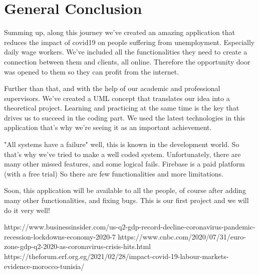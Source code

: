 \documentclass[12pt]{report}
\begin{document}
\chapter*{General Conclusion}
Summing up, along this journey we've created an amazing application that reduces the impact of covid19 on people suffering from unemployment. Especially daily wage workers.
We've included all the functionalities they need to create a connection between them and clients, all online.
Therefore the opportunity door was opened to them so they can profit from the internet.

Further than that, and with the help of our academic and professional supervisors. We've created a UML concept that translates our idea into a theoretical project.
Learning and practicing at the same time is the key that drives us to succeed in the coding part. We used the latest technologies in this application that's why we're seeing it as an important achievement.

"All systems have a failure" well, this is known in the development world. So that's why we've tried to make a well coded system.
Unfortunately, there are many other missed features, and some logical fails. Firebase is a paid platform (with a free trial) So there are few functionalities and more limitations.

Soon, this application will be available to all the people, of course after adding many other functionalities, and fixing bugs. This is our first project and we will do it very well!


\vspace{3cm}
\textbullet https://www.businessinsider.com/us-q2-gdp-record-decline-coronavirus-pandemic-recession-lockdowns-economy-2020-7\newline
\textbullet https://www.cnbc.com/2020/07/31/euro-zone-gdp-q2-2020-as-coronavirus-crisis-hits.html\newline
\textbullet https://theforum.erf.org.eg/2021/02/28/impact-covid-19-labour-markets-evidence-morocco-tunisia/
\end{document}
